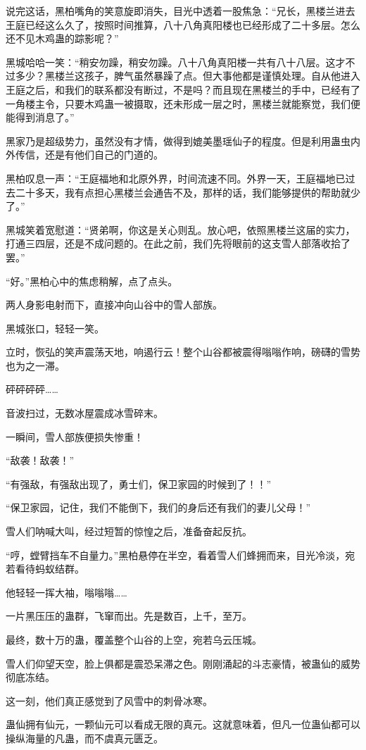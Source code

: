 \begin{this_body}
说完这话，黑柏嘴角的笑意旋即消失，目光中透着一股焦急：“兄长，黑楼兰进去王庭已经这么久了，按照时间推算，八十八角真阳楼也已经形成了二十多层。怎么还不见木鸡蛊的踪影呢？”

黑城哈哈一笑：“稍安勿躁，稍安勿躁。八十八角真阳楼一共有八十八层。这才不过多少？黑楼兰这孩子，脾气虽然暴躁了点。但大事他都是谨慎处理。自从他进入王庭之后，和我们的联系都没有断过，不是吗？而且现在黑楼兰的手中，已经有了一角楼主令，只要木鸡蛊一被摄取，还未形成一层之时，黑楼兰就能察觉，我们便能得到消息了。”

黑家乃是超级势力，虽然没有才情，做得到媲美墨瑶仙子的程度。但是利用蛊虫内外传信，还是有他们自己的门道的。

黑柏叹息一声：“王庭福地和北原外界，时间流速不同。外界一天，王庭福地已过去二十多天，我有点担心黑楼兰会通告不及，那样的话，我们能够提供的帮助就少了。”

黑城笑着宽慰道：“贤弟啊，你这是关心则乱。放心吧，依照黑楼兰这届的实力，打通三四层，还是不成问题的。在此之前，我们先将眼前的这支雪人部落收拾了罢。”

“好。”黑柏心中的焦虑稍解，点了点头。

两人身影电射而下，直接冲向山谷中的雪人部族。

黑城张口，轻轻一笑。

立时，恢弘的笑声震荡天地，响遏行云！整个山谷都被震得嗡嗡作响，磅礴的雪势也为之一滞。

砰砰砰砰……

音波扫过，无数冰屋震成冰雪碎末。

一瞬间，雪人部族便损失惨重！

“敌袭！敌袭！”

“有强敌，有强敌出现了，勇士们，保卫家园的时候到了！！”

“保卫家园，记住，我们不能倒下，我们的身后还有我们的妻儿父母！”

雪人们呐喊大叫，经过短暂的惊惶之后，准备奋起反抗。

“哼，螳臂挡车不自量力。”黑柏悬停在半空，看着雪人们蜂拥而来，目光冷淡，宛若看待蚂蚁结群。

他轻轻一挥大袖，嗡嗡嗡……

一片黑压压的蛊群，飞窜而出。先是数百，上千，至万。

最终，数十万的蛊，覆盖整个山谷的上空，宛若乌云压城。

雪人们仰望天空，脸上俱都是震恐呆滞之色。刚刚涌起的斗志豪情，被蛊仙的威势彻底冻结。

这一刻，他们真正感觉到了风雪中的刺骨冰寒。

蛊仙拥有仙元，一颗仙元可以看成无限的真元。这就意味着，但凡一位蛊仙都可以操纵海量的凡蛊，而不虞真元匮乏。


\end{this_body}
